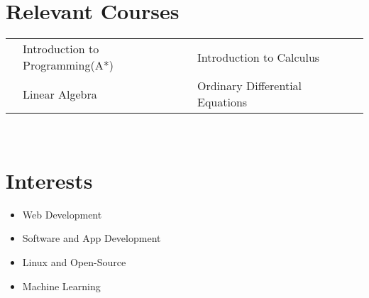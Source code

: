 \documentclass[11pt,a4paper]{article}
\begin{document}
\section*{Relevant Courses}
\begin{tabular}{L{0.05cm} L{6cm} L{5.5cm} L{5.5cm}}
& Introduction to Programming(A*)   & Introduction to Calculus        \\
& Linear Algebra                    & Ordinary Differential  Equations\\
\end{tabular}\\


\section*{Interests}
\begin {itemize}
\setlength\itemsep{0em}		%
\item Web Development
\item Software and App Development
\item Linux and Open-Source
\item Machine Learning
\end{itemize}

\
\end{document}
